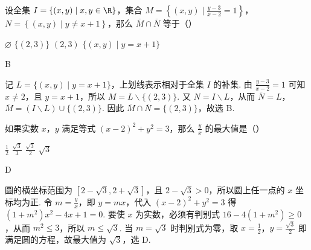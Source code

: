 \begin{problem}
设全集 \(I=\left\{(x,y)\mid x,y\in\R\right\}\)，集合 \(M=\left\{(x,y)\mid \frac{y-3}{x-2}=1\right\}\)，\(N=\left\{(x,y)\mid y\neq x+1\right\}\)，那么 \(\overline{M}\cap \overline{N}\) 等于（\quad）

\choices
    {\(\varnothing\)}
    {\(\{(2,3)\}\)}
    {\((2,3)\)}
    {\(\{(x,y)\mid y=x+1\}\)}

\begin{answer}
B
\end{answer}

\begin{solution}
记 \(L=\{(x,y)\mid y=x+1\}\)，上划线表示相对于全集 \(I\) 的补集. 由 \(\frac{y-3}{x-2}=1\) 可知 \(x\neq2\)，且 \(y=x+1\)，所以 \(M=L\smallsetminus\{(2,3)\}\). 又 \(N=I\smallsetminus L\)，从而 \(\overline{N}=L\)，\(\overline{M}=(I\smallsetminus L)\cup\{(2,3)\}\). 因此 \(\overline{M}\cap\overline{N}=\{(2,3)\}\)，故选 B.
\end{solution}
\end{problem}

\begin{problem}
如果实数 \(x\)，\(y\) 满足等式 \((x-2)^2+y^2=3\)，那么 \(\frac{y}{x}\) 的最大值是（\quad）

\choices
    {\(\frac{1}{2}\)}
    {\(\frac{\sqrt{3}}{3}\)}
    {\(\frac{\sqrt{3}}{2}\)}
    {\(\sqrt{3}\)}

\begin{answer}
D
\end{answer}

\begin{solution}
圆的横坐标范围为 \([2-\sqrt{3},2+\sqrt{3}]\)，且 \(2-\sqrt{3}>0\)，所以圆上任一点的 \(x\) 坐标均为正. 令 \(m=\frac{y}{x}\)，即 \(y=mx\)，代入 \((x-2)^2+y^2=3\) 得 \((1+m^2)x^2-4x+1=0\). 要使 \(x\) 为实数，必须有判别式 \(16-4(1+m^2)\geqslant0\)，从而 \(m^2\leqslant3\)，所以 \(m\leqslant\sqrt{3}\). 当 \(m=\sqrt{3}\) 时判别式为零，取 \(x=\frac{1}{2}\)，\(y=\frac{\sqrt{3}}{2}\) 即满足圆的方程，故最大值为 \(\sqrt{3}\)，选 D.
\end{solution}
\end{problem}

